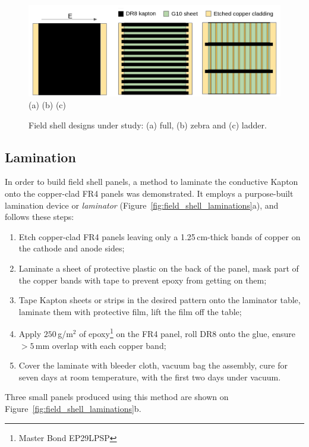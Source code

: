 \documentclass[a4paper,12pt]{article}
\newcommand{\DR}{DR8}
\begin{document}
\begin{figure}[htbp]
\centering

\includegraphics[width=.9\linewidth]{shell_designs_noccc.png} \\
(a) \hspace{0.25\textwidth} (b) \hspace{0.25\textwidth} (c)
\caption{Field shell designs under study: (a) full, (b) zebra and (c) ladder.}
\label{fig:shell_designs}
\end{figure}

\subsection{Lamination}
\label{sec:lamination}
In order to build field shell panels, a method to laminate the conductive Kapton onto the copper-clad FR4 panels was demonstrated. It employs a purpose-built lamination device or \textit{laminator} (Figure~\ref{fig:field_shell_laminations}a), and follows these steps:
\begin{enumerate}
\item Etch copper-clad FR4 panels leaving only a 1.25\,cm-thick bands of copper on the cathode and anode sides;
\item Laminate a sheet of protective plastic on the back of the panel, mask part of the copper bands with tape to prevent epoxy from getting on them;
\item Tape Kapton sheets or strips in the desired pattern onto the laminator table, laminate them with protective film, lift the film off the table;
\item Apply $250$\,g/m$^2$ of epoxy\footnote{Master Bond EP29LPSP} on the FR4 panel, roll {\DR} onto the glue, ensure $>5\,$mm overlap with each copper band;
\item Cover the laminate with bleeder cloth, vacuum bag the assembly, cure for seven days at room temperature, with the first two days under vacuum.
\end{enumerate}
Three small panels produced using this method are shown on Figure~\ref{fig:field_shell_laminations}b.
\end{document}
